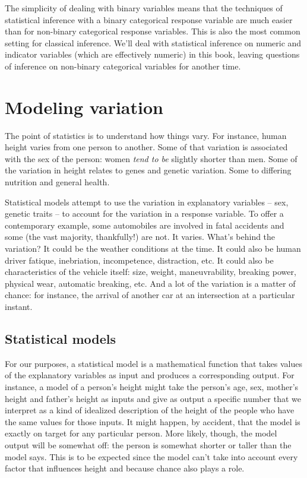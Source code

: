\documentclass[]{tufte-book}
\begin{document}
The simplicity of dealing with binary variables means that the techniques of statistical inference with a binary categorical response variable are much easier than for non-binary categorical response variables. This is also the most common setting for classical inference. We'll deal with statistical inference on numeric and indicator variables (which are effectively numeric) in this book, leaving questions of inference on non-binary categorical variables for another time.

\hypertarget{modeling-variation}{%
\chapter{Modeling variation}\label{modeling-variation}}

The point of statistics is to understand how things vary. For instance, human height varies from one person to another. Some of that variation is associated with the sex of the person: women \emph{tend to be} slightly shorter than men. Some of the variation in height relates to genes and genetic variation. Some to differing nutrition and general health.

Statistical models attempt to use the variation in explanatory variables -- sex, genetic traits -- to account for the variation in a response variable. To offer a contemporary example, some automobiles are involved in fatal accidents and some (the vast majority, thankfully!) are not. It varies. What's behind the variation? It could be the weather conditions at the time. It could also be human driver fatique, inebriation, incompetence, distraction, etc. It could also be characteristics of the vehicle itself: size, weight, maneuvrability, breaking power, physical wear, automatic breaking, etc. And a lot of the variation is a matter of chance: for instance, the arrival of another car at an intersection at a particular instant.

\hypertarget{statistical-models}{%
\section{Statistical models}\label{statistical-models}}

For our purposes, a statistical model is a mathematical function that takes values of the explanatory variables as input and produces a corresponding output. For instance, a model of a person's height might take the person's age, sex, mother's height and father's height as inputs and give as output a specific number that we interpret as a kind of idealized description of the height of the people who have the same values for those inputs. It might happen, by accident, that the model is exactly on target for any particular person. More likely, though, the model output will be somewhat off: the person is somewhat shorter or taller than the model says. This is to be expected since the model can't take into account every factor that influences height and because chance also plays a role.
\end{document}
